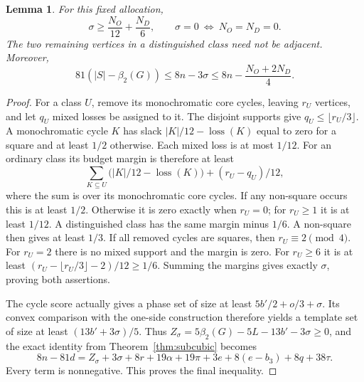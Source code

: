 \documentclass[11pt]{article}
\newtheorem{lemma}[theorem]{Lemma}
\newcommand{\diss}{\beta_2}
\begin{document}
\begin{lemma}\label{lem:phase-slack}
For this fixed allocation,
\[
 \sigma\ge\frac{N_O}{12}+\frac{N_D}{6},\qquad
 \sigma=0\ \Longleftrightarrow\ N_O=N_D=0.
\]
The two remaining vertices in a distinguished class need not be adjacent.
Moreover,
\[
 81(|S|-\diss(G))\le8n-3\sigma
                   \le8n-\frac{N_O+2N_D}{4}.
\]
\end{lemma}
\begin{proof}
For a class $U$, remove its monochromatic core cycles, leaving $r_U$
vertices, and let $q_U$ mixed losses be assigned to it. The disjoint
supports give $q_U\le\lfloor r_U/3\rfloor$. A monochromatic cycle $K$
has slack $|K|/12-\operatorname{loss}(K)$ equal to zero for a square
and at least $1/2$ otherwise. Each mixed loss is at most $1/12$.
For an ordinary class its budget margin is therefore at least
\[
 \sum_{K\subseteq U}
   \bigl(|K|/12-\operatorname{loss}(K)\bigr)
   +(r_U-q_U)/12,
\]
where the sum is over its monochromatic core cycles. If any non-square
occurs this is at least $1/2$. Otherwise it is zero exactly when $r_U=0$;
for $r_U\ge1$ it is at least $1/12$.
A distinguished class has the same margin minus $1/6$. A non-square
then gives at least $1/3$. If all removed cycles are squares, then
$r_U\equiv2\pmod4$. For $r_U=2$ there is no mixed support and the margin
is zero. For $r_U\ge6$ it is at least
$(r_U-\lfloor r_U/3\rfloor-2)/12\ge1/6$.
Summing the margins gives exactly $\sigma$, proving both assertions.

The cycle score actually gives a phase set of size at least
$5b'/2+o/3+\sigma$. Its convex comparison with the one-side construction
therefore yields a template set of size at least $(13b'+3\sigma)/5$.
Thus $Z_\sigma=5\diss(G)-5L-13b'-3\sigma\ge0$, and the exact identity
from Theorem~\ref{thm:subcubic} becomes
\[
 8n-81d=Z_\sigma+3\sigma+8r+19\alpha+19\pi+3e
                  +8(e-b_3)+8q+38\tau.
\]
Every term is nonnegative. This proves the final inequality.
\end{proof}
\end{document}
